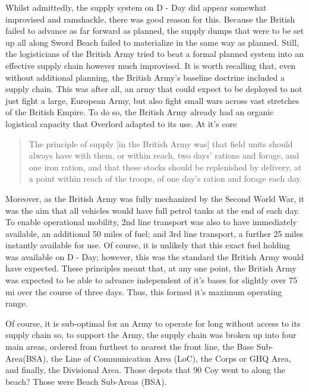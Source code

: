 \documentclass[noraggedright]{turabian-researchpaper}
\newcommand{\Petrol}{Precis of Lecture No. 12:  Petrol}
\begin{document}
Whilst admittedly, the supply system on D - Day did appear somewhat improvised
and ramshackle, there was good reason for this.  Because the British failed to
advance as far forward as planned, the supply dumps that were to be set up all
along Sword Beach failed to materialize in the same way as planned.  Still,
the logisticians of the British Army tried to beat a formal planned system
into an effective supply chain however much improvised.  It is worth recalling
that, even without additional planning, the British Army's baseline doctrine 
included a supply chain.  This was after all, an army that could expect to be
deployed to not just fight a large, European Army, but also fight small wars
across vast stretches of the British Empire.  To do so, the British Army already
had an organic logistical capacity that Overlord adapted to its use.  
At it's core

\begin{quotation}
	 The principle of supply [in the British Army was] that field units 
	should always have
	 with them, or within reach, two days' rations and forage, and one 
	 iron ration, and that these stocks should be replenished by 
	 delivery, at a point within reach of the troops, of one day's ration
	 and forage each day. %
	
\end{quotation}

Moreover, as the British Army was fully mechanized by the Second World War,
it was the aim that all vehicles would have full petrol tanks at the end of
each day. To enable operational mobility, 2nd line transport was also to have 
immediately available, an additional 50 miles of fuel; and 3rd line transport,
a further 25 miles instantly available for use.\autocite[\Petrol][s 3]
{27course}
Of course, it is unlikely that this exact fuel holding was available on 
D - Day;
however, this was the standard the British Army would have expected.  These
principles meant that, at any one point, the British Army was expected to be
able to advance independent of it's bases for slightly over 75 mi over the 
course of three days.  Thus, this formed it's maximum operating range.

Of course, it is sub-optimal for an Army to operate for long without access to
its supply chain so, to support the Army, the supply chain was broken up into 
four main areas, ordered from furthest to nearest the front line, 
the Base Sub-Area(BSA), the Line of Communication Area (LoC), the Corps or 
GHQ Area, and finally, the Divisional Area.  Those depots that 90 Coy went to
along the beach?  Those were Beach Sub-Areas (BSA).  
\end{document}
